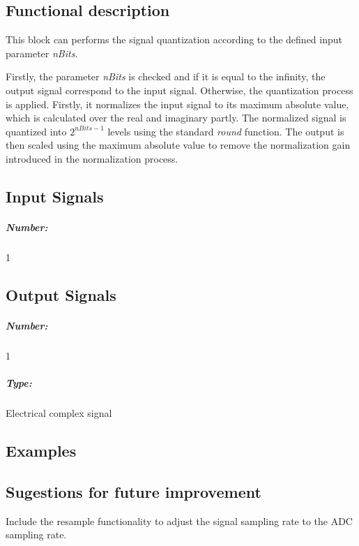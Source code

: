 \subsection*{Functional description}

This block can performs the signal quantization according to the defined input parameter \textit{nBits}. 

Firstly, the parameter \textit{nBits} is checked and if it is equal to the infinity, the output signal correspond to the input signal. Otherwise, the quantization process is applied. Firstly, it normalizes the input signal to its maximum absolute value, which is calculated over the real and imaginary partly. The normalized signal is quantized into $2^{nBits-1}$ levels using the standard \textit{round} function. The output is then scaled using the maximum absolute value to remove the normalization gain introduced in the normalization process.


\pagebreak
\subsection*{Input Signals}

\subparagraph*{Number:} 1

\subsection*{Output Signals}

\subparagraph*{Number:} 1

\subparagraph*{Type:} Electrical complex signal

\subsection*{Examples}

\subsection*{Sugestions for future improvement}

Include the resample functionality to adjust the signal sampling rate to the ADC sampling rate. 

